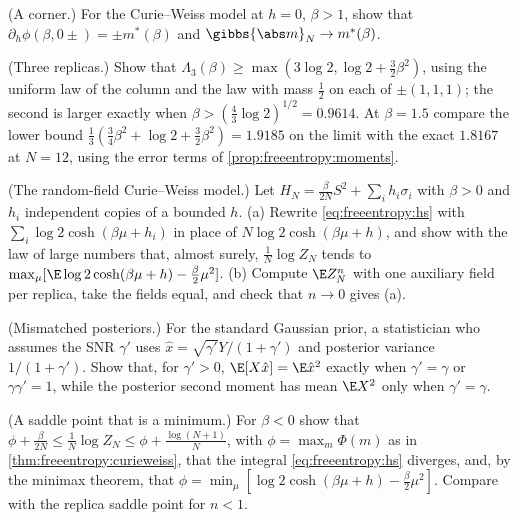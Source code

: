 \begin{refsection}
\begin{exercises}
\item \consolidation (A corner.) For the Curie--Weiss model at $h=0$, $\beta>1$, show that $\partial_h\phi(\beta,0\pm)=\pm m^*(\beta)$ and $\gibbs{\abs m}_N\to m^*(\beta)$. \label{ex:freeentropy:corner}

\item \byhand (Three replicas.) Show that $\Lambda_3(\beta)\ge\max(3\log2,\log2+\frac32\beta^2)$, using the uniform law of the column and the law with mass $\frac12$ on each of $\pm(1,1,1)$; the second is larger exactly when $\beta>(\frac43\log2)^{1/2}=0.9614$. At $\beta=1.5$ compare the lower bound $\frac13(\frac34\beta^2+\log2+\frac32\beta^2)=1.9185$ on the limit with the exact $1.8167$ at $N=12$, using the error terms of \cref{prop:freeentropy:moments}.\label{ex:freeentropy:threereplicas}

\item \byhand (The random-field Curie--Weiss model.) Let $H_N=\frac\beta{2N}S^2+\sum_ih_i\sigma_i$ with $\beta>0$ and $h_i$ independent copies of a bounded $h$. (a) Rewrite \eqref{eq:freeentropy:hs} with $\sum_i\log2\cosh(\beta\mu+h_i)$ in place of $N\log2\cosh(\beta\mu+h)$, and show with the law of large numbers that, almost surely, $\frac1N\log Z_N$ tends to $\max_\mu[\E\log2\cosh(\beta\mu+h)-\frac\beta2\mu^2]$. (b) Compute $\E Z_N^n$ with one auxiliary field per replica, take the fields equal, and check that $n\to0$ gives (a).\label{ex:freeentropy:rfcw}

\item \byhand (Mismatched posteriors.) For the standard Gaussian prior, a statistician who assumes the SNR $\gamma'$ uses $\hat x=\sqrt{\gamma'}Y/(1+\gamma')$ and posterior variance $1/(1+\gamma')$. Show that, for $\gamma'>0$, $\E[X\hat x]=\E\hat x^2$ exactly when $\gamma'=\gamma$ or $\gamma\gamma'=1$, while the posterior second moment has mean $\E X^2$ only when $\gamma'=\gamma$.\label{ex:freeentropy:mismatch}

\item \translate (A saddle point that is a minimum.) For $\beta<0$ show that $\phi+\frac\beta{2N}\le\frac1N\log Z_N\le\phi+\frac{\log(N+1)}N$, with $\phi=\max_m\Phi(m)$ as in \cref{thm:freeentropy:curieweiss}, that the integral \eqref{eq:freeentropy:hs} diverges, and, by the minimax theorem, that $\phi=\min_\mu[\log2\cosh(\beta\mu+h)-\frac\beta2\mu^2]$. Compare with the replica saddle point for $n<1$.\label{ex:freeentropy:antiferro}


\end{exercises}
\end{refsection}
